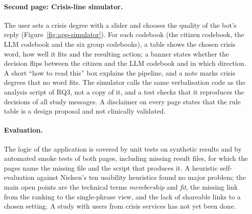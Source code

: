 \paragraph{Second page: Crisis-line simulator.}
The user sets a crisis degree with a slider and chooses the quality of the bot's reply (Figure~\ref{fig:app-simulator}).
For each codebook (the citizen codebook, the LLM codebook and the six group codebooks), a table shows the chosen crisis word, how
well it fits and the resulting action; a banner states whether the decision flips between the citizen and the LLM
codebook and in which direction.
A short ``how to read this'' box explains the pipeline, and a note marks crisis degrees that no word fits.
The simulator calls the same verbalisation code as the analysis script of RQ3, not a copy of it, and a test checks that
it reproduces the decisions of all \WthreeNItems{} study messages.
A disclaimer on every page states that the rule table is a design proposal and not clinically validated.

\paragraph{Evaluation.}
The logic of the application is covered by unit tests on synthetic results and by automated smoke tests of both pages,
including missing result files, for which the pages name the missing file and the script that produces it.
A heuristic self-evaluation against Nielsen's ten usability heuristics \citep{nielsen1994enhancing} found no major
problem; the main open points are the technical terms \emph{membership} and \emph{fit}, the missing link from the
ranking to the single-phrase view, and the lack of shareable links to a chosen setting.
A study with users from crisis services has not yet been done.
